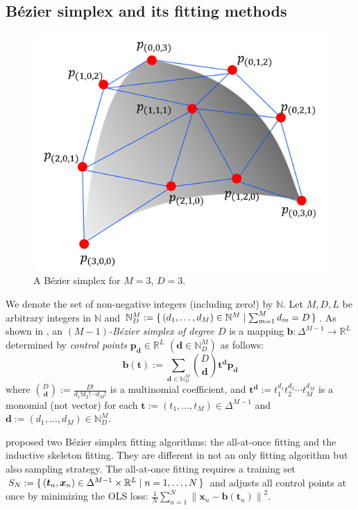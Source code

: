 \documentclass[letterpaper]{article} %
\theoremstyle{plain}
\newcommand{\norm}[1]{\left\| #1 \right\|}
\newcommand{\R}{\mathbb{R}}
\newcommand{\N}{\mathbb{N}}
\begin{document}
\subsection{B\'ezier simplex and its fitting methods}\label{sec:bezier-simplex}
\begin{figure}[t]
    \centering%
    \includegraphics[width=0.75\hsize]{bezier-triangle.png}
    \caption{A B\'ezier simplex for $M = 3$, $D = 3$.}\label{fig:Bezier-simplex}
\end{figure}
We denote the set of non-negative integers (including zero!) by $\N$.
Let $M, D, L$ be arbitrary integers in $\N$ and $\N_D^M := \set{(d_1, \dots, d_M) \in \N^M | \sum_{m = 1}^M d_m = D}$.
As shown in , an \emph{$(M - 1)$-B\'ezier simplex of degree $D$} is a mapping $\bm b: \Delta^{M - 1} \to \R^L$ determined by \emph{control points} $\bm p_{\bm d} \in \R^L$ $(\bm d \in \N_D^M)$ as follows:
\begin{equation}\label{eqn:bezier-simplex}
    \bm b(\bm t) := \sum_{\bm d \in \N_D^M} \binom{D}{\bm d} \bm t^{\bm d} \bm p_{\bm d}
\end{equation}
where $\binom{D}{\bm d} := \frac{D!}{d_1! d_2! \cdots d_M!}$ is a multinomial coefficient, and $\bm t^{\bm d} := t^{d_1}_1 t^{d_2}_2 \cdots t^{d_M}_M$ is a monomial (not vector) for each $\bm t := (t_1, \dots, t_M) \in \Delta^{M - 1}$ and $\bm d := (d_1, \dots, d_M) \in \N^M_D$.

\cite{Kobayashi2019} proposed two B\'ezier simplex fitting algorithms: the all-at-once fitting and the inductive skeleton fitting.
They are different in not an only fitting algorithm but also sampling strategy.
The all-at-once fitting requires a training set $S_N:=\set{(\bm t_n, \bm x_n) \in \Delta^{M - 1} \times \R^L | n = 1, \dots, N}$ and adjusts all control points at once by minimizing the OLS loss: $\frac{1}{N}\sum_{n = 1}^N \norm{\bm x_n - \bm b(\bm t_n)}^2$.
\end{document}
